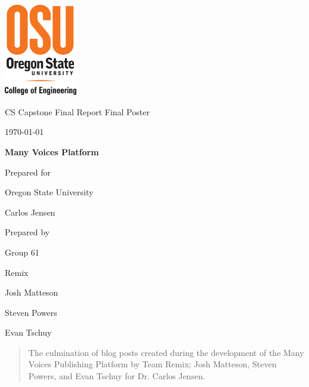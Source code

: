 \documentclass[onecolumn, draftclsnofoot,10pt, compsoc]{IEEEtran}
\def \CapstoneTeamName{		Remix}
\def \CapstoneTeamNumber{		61}
\def \GroupMemberOne{			Josh Matteson}
\def \GroupMemberTwo{			Steven Powers}
\def \GroupMemberThree{			Evan Tschuy}
\def \CapstoneProjectName{		Many Voices Platform}
\def \CapstoneSponsorCompany{	Oregon State University}
\def \CapstoneSponsorPerson{		Carlos Jensen}
\def \DocType{
	Final Report Final Poster
}
\newcommand{\NameSigPair}[1]{\par
	\makebox[2.75in][r]{#1} \hfil 	\makebox[3.25in]{\makebox[2.25in]{\hrulefill} \hfill		\makebox[.75in]{\hrulefill}}
	\par\vspace{-12pt} \textit{\tiny\noindent
		\makebox[2.75in]{} \hfil		\makebox[3.25in]{\makebox[2.25in][r]{Signature} \hfill	\makebox[.75in][r]{Date}}}}
\renewcommand{\NameSigPair}[1]{#1}
\begin{document}
	
\begin{titlepage}
	\begin{singlespace}
		\includegraphics[height=4cm]{../../coe_v_spot1}
		\hfill
		\par\vspace{.2in}
		\centering
		\scshape{
			\huge CS Capstone \DocType \par
			{\large\today}\par
			\vspace{.5in}
			\textbf{\Huge\CapstoneProjectName}\par
			\vfill
			{\large Prepared for}\par
			\Huge \CapstoneSponsorCompany\par
			\vspace{5pt}
			{\Large\NameSigPair{\CapstoneSponsorPerson}\par}
			{\large Prepared by }\par
			Group\CapstoneTeamNumber\par
			\CapstoneTeamName\par
			\vspace{5pt}
			{\Large
				\NameSigPair{\GroupMemberOne}\par
				\NameSigPair{\GroupMemberTwo}\par
				\NameSigPair{\GroupMemberThree}\par
			}
			\vspace{20pt}
		}
		\begin{abstract}
			\noindent The culmination of blog posts created during the development of the Many
			Voices Publishing Platform by Team Remix; Josh Matteson, Steven Powers, and Evan Tschuy 
			for Dr. Carlos Jensen. 
		\end{abstract}
	\end{singlespace}
\end{titlepage}

	
\end{document}
